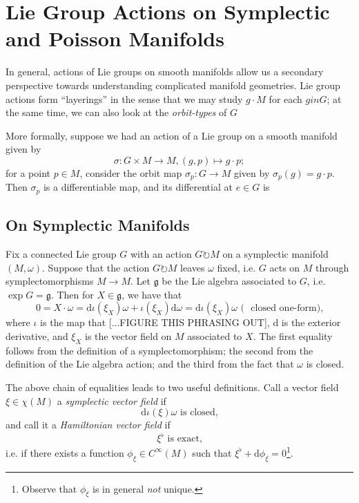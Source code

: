 \documentclass{tufte-handout}
\def\d{\mathrm{d}}
\begin{document}
\section{Lie Group Actions on Symplectic and Poisson Manifolds}
In general, actions of Lie groups on smooth manifolds allow us a secondary perspective towards understanding complicated manifold geometries. Lie group actions form ``layerings'' in the sense that we may study $g \cdot M$ for each $g in G$; at the same time, we can also look at the \emph{orbit-types} of $G$ %

More formally, suppose we had an action of a Lie group on a smooth manifold given by
$$
\sigma: G \times M \to M, (g,p) \mapsto g \cdot p;
$$
for a point $p \in M$, consider the orbit map $\sigma_p: G \to M$ given by $\sigma_p(g) = g \cdot p$. Then $\sigma_p$ is a differentiable map, and its differential at $e \in G$ is %

\subsection{On Symplectic Manifolds}
Fix a connected Lie group $G$ with an action $G \circlearrowright M$ on a symplectic manifold $(M,\omega)$. Suppose that the action $G \circlearrowright M$ leaves $\omega$ fixed, i.e. $G$ acts on $M$ through symplectomorphisms $M \to M$. Let $\mathfrak{g}$ be the Lie algebra associated to $G$, i.e. $\exp G = \mathfrak{g}$. Then for $X \in \mathfrak{g}$, we have that
$$
0 = X \cdot \omega = \d \iota(\xi_X)\omega + \iota(\xi_X)\d \omega = \d \iota(\xi_X)\omega \mbox{ (~ closed one-form),}
$$
where $\iota$ is the map that [...FIGURE THIS PHRASING OUT], $\d$ is the exterior derivative, and $\xi_X$ is the vector field on $M$ associated to $X$. The first equality follows from the definition of a symplectomorphism; the second from the definition of the Lie algebra action; and the third from the fact that $\omega$ is closed. %

The above chain of equalities leads to two useful definitions. Call a vector field $\xi \in \chi(M)$ a \emph{symplectic vector field} if
$$
\d \iota(\xi)\omega \mbox{ is closed,}
$$
and call it a \emph{Hamiltonian vector field} if
$$
\xi^\flat \mbox{ is exact,}
$$
i.e. if there exists a function $\phi_\xi \in C^\infty(M)$ such that $\xi^\flat + \d \phi_\xi = 0$\footnote{Observe that $\phi_\xi$ is in general \emph{not} unique.}.
\end{document}
